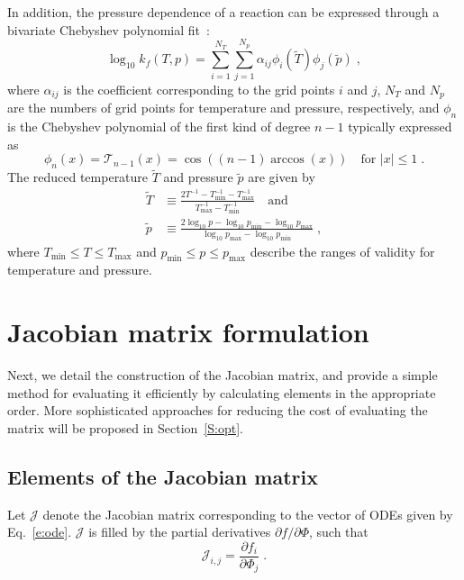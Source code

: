 \documentclass[preprint,12pt]{elsarticle}
\newcommand{ \dydx } [2] { \frac{ \partial #1 }{ \partial #2 } }
\begin{document}
In addition, the pressure dependence of a reaction can be expressed through a bivariate Chebyshev polynomial fit~\cite{Venkatesh:1997hv,Venkatesh:1997ik,Venkatesh:2000gj,chemkin:2012,Goodwin:2015aa}:
\begin{equation}
\log_{10} k_f (T, p) = \sum_{i = 1}^{N_T} \sum_{j = 1}^{N_p} \alpha_{ij} \phi_i (\tilde{T}) \phi_j \left(\tilde{p}\right) \label{e:cheb} \;,
\end{equation}
where $\alpha_{ij}$ is the coefficient corresponding to the grid points $i$ and $j$, $N_T$ and $N_p$ are the numbers of grid points for temperature and pressure, respectively, and $\phi_n$ is the Chebyshev polynomial of the first kind of degree $n - 1$ typically expressed as
\begin{equation}
\phi_n (x) = \mathcal{T}_{n-1} (x) = \cos \left( (n - 1) \arccos (x) \right) \quad \text{for } |x| \leq 1 \;.
\end{equation}
The reduced temperature $\tilde{T}$ and pressure $\tilde{p}$ are given by
\begin{align}
\tilde{T} &\equiv \frac{2 T^{-1} - T^{-1}_{\min} - T^{-1}_{\max}}{T^{-1}_{\max} - T^{-1}_{\min}} \quad\text{and} \\
\tilde{p} &\equiv \frac{2\log_{10} p - \log_{10} p_{\min} - \log_{10} p_{\max}}{\log_{10} p_{\max} - \log_{10} p_{\min}} \;,
\end{align}
where $T_{\min} \leq T \leq T_{\max}$ and $p_{\min} \leq p \leq p_{\max}$ describe the ranges of validity for temperature and pressure.


\section{Jacobian matrix formulation}
\label{S:jacobian}

Next, we detail the construction of the Jacobian matrix, and provide a simple method for evaluating it efficiently by calculating elements in the appropriate order.
More sophisticated approaches for reducing the cost of evaluating the matrix will be proposed in Section~\ref{S:opt}.

\subsection{Elements of the Jacobian matrix}

Let $\mathcal{J}$ denote the Jacobian matrix corresponding to the vector of ODEs given by Eq.~\eqref{e:ode}.
$\mathcal{J}$ is filled by the partial derivatives $\partial f / \partial \Phi$, such that
\begin{equation}
\mathcal{J}_{i,j} = \dydx{f_i}{\Phi_j} \;.
\end{equation}
\end{document}

